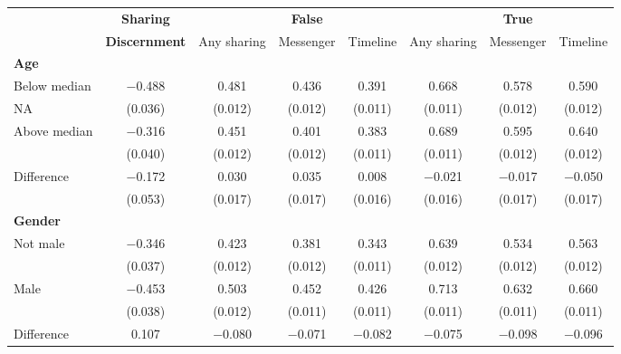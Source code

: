 
\begin{tabular}[t]{lccccccc}
 & \textbf{Sharing} &  & \textbf{False} &  &  & \textbf{True} & \\
 & \textbf{Discernment} & Any sharing & Messenger & Timeline & Any sharing & Messenger & Timeline\\\cmidrule(lr){2-2} \cmidrule(lr){3-5} \cmidrule(lr){6-8} \multicolumn{4}{l}{\textbf{Age}} \rule{0pt}{1.2\normalbaselineskip}\\
\hspace{1em} Below median & \num{-0.488} & \num{0.481} & \num{0.436} & \num{0.391} & \num{0.668} & \num{0.578} & \num{0.590}\\
\hspace{2em}NA & (\num{0.036}) & (\num{0.012}) & (\num{0.012}) & (\num{0.011}) & (\num{0.011}) & (\num{0.012}) & (\num{0.012})\\
\hspace{1em} Above median & \num{-0.316} & \num{0.451} & \num{0.401} & \num{0.383} & \num{0.689} & \num{0.595} & \num{0.640}\\
\hspace{2em} & (\num{0.040}) & (\num{0.012}) & (\num{0.012}) & (\num{0.011}) & (\num{0.011}) & (\num{0.012}) & (\num{0.012})\\\cmidrule(lr){2-8}
\hspace{1em} Difference & \num{-0.172} & \num{0.030} & \num{0.035} & \num{0.008} & \num{-0.021} & \num{-0.017} & \num{-0.050}\\
 & (\num{0.053}) & (\num{0.017}) & (\num{0.017}) & (\num{0.016}) & (\num{0.016}) & (\num{0.017}) & (\num{0.017})\\\multicolumn{4}{l}{\textbf{Gender}} \rule{0pt}{1.2\normalbaselineskip}\\
\hspace{1em} Not male & \num{-0.346} & \num{0.423} & \num{0.381} & \num{0.343} & \num{0.639} & \num{0.534} & \num{0.563}\\
 & (\num{0.037}) & (\num{0.012}) & (\num{0.012}) & (\num{0.011}) & (\num{0.012}) & (\num{0.012}) & (\num{0.012})\\
\hspace{1em} Male & \num{-0.453} & \num{0.503} & \num{0.452} & \num{0.426} & \num{0.713} & \num{0.632} & \num{0.660}\\
 & (\num{0.038}) & (\num{0.012}) & (\num{0.011}) & (\num{0.011}) & (\num{0.011}) & (\num{0.011}) & (\num{0.011})\\\cmidrule(lr){2-8}
\hspace{1em} Difference & \num{0.107} & \num{-0.080} & \num{-0.071} & \num{-0.082} & \num{-0.075} & \num{-0.098} & \num{-0.096}\\

\end{tabular}

